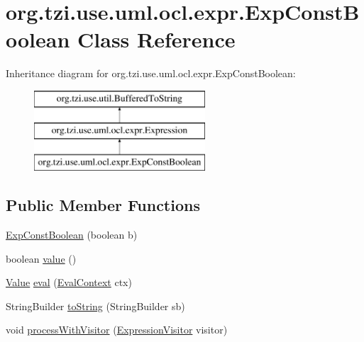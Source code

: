 \hypertarget{classorg_1_1tzi_1_1use_1_1uml_1_1ocl_1_1expr_1_1_exp_const_boolean}{\section{org.\-tzi.\-use.\-uml.\-ocl.\-expr.\-Exp\-Const\-Boolean Class Reference}
\label{classorg_1_1tzi_1_1use_1_1uml_1_1ocl_1_1expr_1_1_exp_const_boolean}
}
Inheritance diagram for org.\-tzi.\-use.\-uml.\-ocl.\-expr.\-Exp\-Const\-Boolean\-:\begin{figure}[H]
\begin{center}
\leavevmode
\includegraphics[height=3.000000cm]{classorg_1_1tzi_1_1use_1_1uml_1_1ocl_1_1expr_1_1_exp_const_boolean}
\end{center}
\end{figure}
\subsection*{Public Member Functions}
\begin{DoxyCompactItemize}
\item 
\hyperlink{classorg_1_1tzi_1_1use_1_1uml_1_1ocl_1_1expr_1_1_exp_const_boolean_aa19525d6bda8f5338f7757f7606b2233}{Exp\-Const\-Boolean} (boolean b)
\item 
boolean \hyperlink{classorg_1_1tzi_1_1use_1_1uml_1_1ocl_1_1expr_1_1_exp_const_boolean_a6fcfc101a46174a179bd66c2fecd7c86}{value} ()
\item 
\hyperlink{classorg_1_1tzi_1_1use_1_1uml_1_1ocl_1_1value_1_1_value}{Value} \hyperlink{classorg_1_1tzi_1_1use_1_1uml_1_1ocl_1_1expr_1_1_exp_const_boolean_a7974afb82d83ca2d1001df7ee2391ac1}{eval} (\hyperlink{classorg_1_1tzi_1_1use_1_1uml_1_1ocl_1_1expr_1_1_eval_context}{Eval\-Context} ctx)
\item 
String\-Builder \hyperlink{classorg_1_1tzi_1_1use_1_1uml_1_1ocl_1_1expr_1_1_exp_const_boolean_a13ed9be3b39383968d12bc2586c537a2}{to\-String} (String\-Builder sb)
\item 
void \hyperlink{classorg_1_1tzi_1_1use_1_1uml_1_1ocl_1_1expr_1_1_exp_const_boolean_acd4517a5d2e3c04f516d8b867e9d7cc9}{process\-With\-Visitor} (\hyperlink{interfaceorg_1_1tzi_1_1use_1_1uml_1_1ocl_1_1expr_1_1_expression_visitor}{Expression\-Visitor} visitor)
\end{DoxyCompactItemize}
